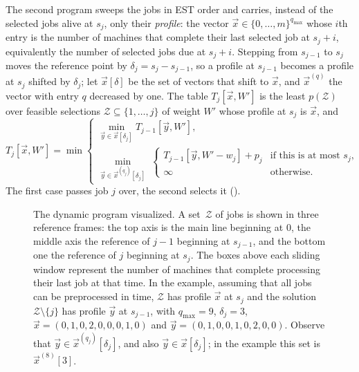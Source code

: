 \documentclass[11pt,a4paper]{article}
\theoremstyle{definition}
\theoremstyle{plain}
\newcommand{\qmax}{q_{\max}}
\newcommand{\calZ}{\mathcal{Z}}
\newcommand{\vecx}{\vec{x}}
\begin{document}
The second program sweeps the jobs in EST order and carries, instead of the selected jobs alive
at $s_j$, only their \emph{profile}: the vector $\vecx\in\{0,\ldots,m\}^{\qmax}$ whose $i$th
entry is the number of machines that complete their last selected job at $s_j+i$, equivalently
the number of selected jobs due at $s_j+i$. Stepping from $s_{j-1}$ to $s_j$ moves the
reference point by $\delta_j=s_j-s_{j-1}$, so a profile at $s_{j-1}$ becomes a profile at $s_j$
shifted by $\delta_j$; let $\vecx[\delta]$ be the set of vectors that shift to $\vecx$, and
$\vecx^{(q)}$ the vector with entry $q$ decreased by one. The table
$T_j[\vecx,W']$ is the least $p(\calZ)$ over feasible selections $\calZ\subseteq\{1,\ldots,j\}$
of weight $W'$ whose profile at $s_j$ is $\vecx$, and
\begin{equation}\label{eq:lastrec}
T_j[\vecx,W']=\min\begin{cases}
\min_{\vec y\in\vecx[\delta_j]}T_{j-1}[\vec y,W'],\\
\min_{\vec y\in\vecx^{(q_j)}[\delta_j]}\;\begin{cases}
T_{j-1}[\vec y,W'-w_j]+p_j & \text{if this is at most }s_j,\\
\infty & \text{otherwise.}\end{cases}
\end{cases}
\end{equation}
The first case passes job $j$ over, the second selects it ().

\begin{figure}[tb]
    \centering
    
    \caption{The dynamic program visualized. A set~$\calZ$ of jobs is shown in three reference
    frames: the top axis is the main line beginning at $0$, the middle axis the reference of $j-1$
    beginning at $s_{j-1}$, and the bottom one the reference of $j$ beginning at $s_j$. The boxes
    above each sliding window represent the number of machines that complete processing their last
    job at that time. In the example, assuming that all jobs can be preprocessed in time, $\calZ$
    has profile $\vecx$ at $s_j$ and the solution $\calZ\setminus\{j\}$ has profile $\vec y$ at
    $s_{j-1}$, with $\qmax=9$, $\delta_j=3$, $\vecx=(0,1,0,2,0,0,0,1,0)$ and
    $\vec y=(0,1,0,0,1,0,2,0,0)$. Observe that $\vec y\in\vecx^{(q_j)}[\delta_j]$, and also
    $\vec y\in\vecx[\delta_j]$; in the example this set is $\vecx^{(8)}[3]$.}
    \label{fig:profile}
\end{figure}
\end{document}
